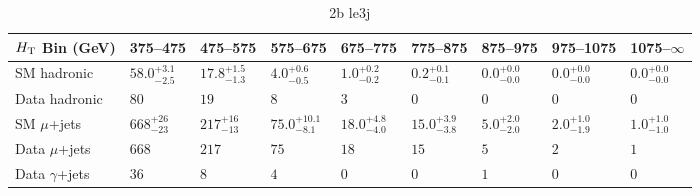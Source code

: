 \documentclass[8pt]{article}
\def\scalht{\mbox{$H_{\rm{T}}$}\xspace}
\newcommand\T{\rule{0pt}{2.6ex}}
\newcommand\B{\rule[-1.2ex]{0pt}{0pt}}
\begin{document}
\begin{table}[ht!]
\caption{2b le3j}
\label{tab:ensemble-2b le3j}
\centering
\begin{tabular}{ lllllllll }

\hline
\scalht Bin (GeV)       & 375--475                       & 475--575                       & 575--675                       & 675--775                       & 775--875                       & 875--975                       & 975--1075                      & 1075--$\infty$                 \\ [1.000000ex]
\hline
SM hadronic\T           & $58.0^{+3.1}_{-2.5}$           & $17.8^{+1.5}_{-1.3}$           & $4.0^{+0.6}_{-0.5}$            & $1.0^{+0.2}_{-0.2}$            & $0.2^{+0.1}_{-0.1}$            & $0.0^{+0.0}_{-0.0}$            & $0.0^{+0.0}_{-0.0}$            & $0.0^{+0.0}_{-0.0}$            \\ 
Data hadronic\B         & $80$                           & $19$                           & $8$                            & $3$                            & $0$                            & $0$                            & $0$                            & $0$                            \\ 
\hline
SM $\mu$+jets\T         & $668^{+26}_{-23}$              & $217^{+16}_{-13}$              & $75.0^{+10.1}_{-8.1}$          & $18.0^{+4.8}_{-4.0}$           & $15.0^{+3.9}_{-3.8}$           & $5.0^{+2.0}_{-2.0}$            & $2.0^{+1.0}_{-1.9}$            & $1.0^{+1.0}_{-1.0}$            \\ 
Data $\mu$+jets\B       & $668$                          & $217$                          & $75$                           & $18$                           & $15$                           & $5$                            & $2$                            & $1$                            \\ 
\hline
Data $\gamma$+jets\B    & $36$                           & $8$                            & $4$                            & $0$                            & $0$                            & $1$                            & $0$                            & $0$                            \\ 
\hline

\end{tabular}
\end{table}
\end{document}
